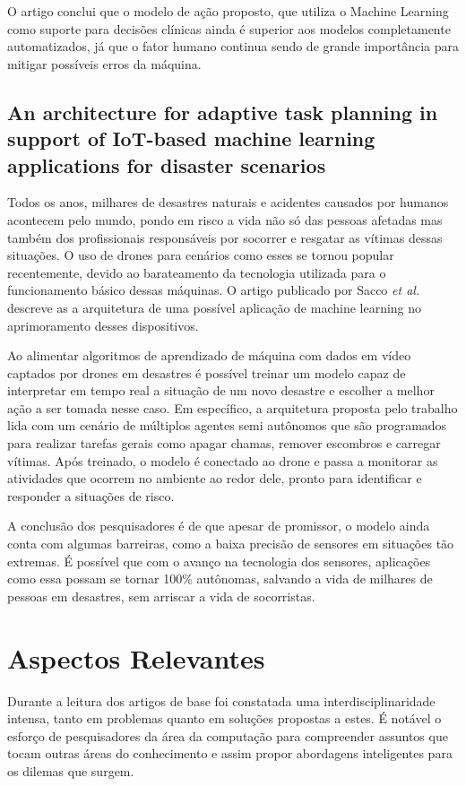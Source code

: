 \documentclass[12pt]{article}
\begin{document}
O artigo conclui que o modelo de ação proposto, que utiliza o Machine Learning como suporte para decisões clínicas ainda é superior aos modelos completamente automatizados, já que o fator humano continua sendo de grande importância para mitigar possíveis erros da máquina.

\subsection{An architecture for adaptive task planning in support of IoT-based machine learning applications for disaster scenarios \cite{sacco}}

Todos os anos, milhares de desastres naturais e acidentes causados por humanos acontecem pelo mundo, pondo em risco a vida não só das pessoas afetadas mas também dos profissionais responsáveis por socorrer e resgatar as vítimas dessas situações. O uso de drones para cenários como esses se tornou popular recentemente, devido ao barateamento da tecnologia utilizada para o funcionamento básico dessas máquinas. O artigo publicado por Sacco \emph{et al.} descreve as a arquitetura de uma possível aplicação de machine learning no aprimoramento desses dispositivos.

Ao alimentar algoritmos de aprendizado de máquina com dados em vídeo captados por drones em desastres é possível treinar um modelo capaz de interpretar em tempo real a situação de um novo desastre e escolher a melhor ação a ser tomada nesse caso. Em específico, a arquitetura proposta pelo trabalho lida com um cenário de múltiplos agentes semi autônomos que são programados para realizar tarefas gerais como apagar chamas, remover escombros e carregar vítimas. Após treinado, o modelo é conectado ao drone e passa a monitorar as atividades que ocorrem no ambiente ao redor dele, pronto para identificar e responder a situações de risco.

A conclusão dos pesquisadores é de que apesar de promissor, o modelo ainda conta com algumas barreiras, como a baixa precisão de sensores em situações tão extremas. É possível que com o avanço na tecnologia dos sensores, aplicações como essa possam se tornar 100\% autônomas, salvando a vida de milhares de pessoas em desastres, sem arriscar a vida de socorristas.

\section{Aspectos Relevantes}

Durante a leitura dos artigos de base foi constatada uma interdisciplinaridade intensa, tanto em problemas quanto em soluções propostas a estes. É notável o esforço de pesquisadores da área da computação para compreender assuntos que tocam outras áreas do conhecimento e assim propor abordagens inteligentes para os dilemas que surgem.
\end{document}
